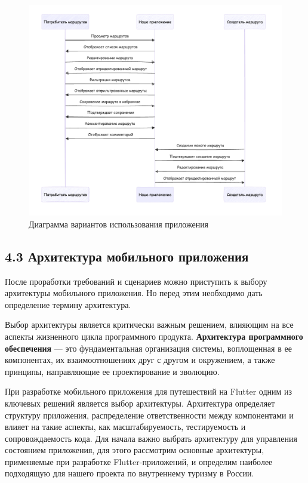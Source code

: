 \begin{figure}[h!]
    \centering
    \includegraphics[width=1\linewidth]{Images/mobile_logic/диаграмма_вариантов_использования.png}
    \caption{Диаграмма вариантов использования приложения}
    \label{fig:enter-label}
\end{figure}

\subsection*{4.3 Архитектура мобильного приложения}


После проработки требований и сценариев можно приступить к выбору архитектуры мобильного приложения. Но перед этим необходимо дать определение термину архитектура. 

Выбор архитектуры является критически важным решением, влияющим на все аспекты жизненного цикла программного продукта. \textbf{Архитектура программного обеспечения} — это фундаментальная организация системы, воплощенная в ее компонентах, их взаимоотношениях друг с другом и окружением, а также принципы, направляющие ее проектирование и эволюцию.


При разработке мобильного приложения для путешествий на Flutter одним из ключевых решений является выбор архитектуры. Архитектура определяет структуру приложения, распределение ответственности между компонентами и влияет на такие аспекты, как масштабируемость, тестируемость и сопровождаемость кода. Для начала важно выбрать архитектуру для управления состоянием приложения, для этого рассмотрим основные архитектуры, применяемые при разработке Flutter-приложений, и определим наиболее подходящую для нашего проекта по внутреннему туризму в России.

